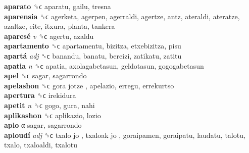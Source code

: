 \textbf{aparato} ␝ϲ  aparatu, gailu, tresna  \\
\textbf{aparensia} ␝ϲ  agerketa, agerpen, agerraldi, agertze, antz, ateraldi, ateratze, azaltze, eite, itxura, planta, tankera  \\
\textbf{aparesé} \emph{v}  ␝ϲ  agertu, azaldu  \\
\textbf{apartamento} ␝ϲ  apartamentu, bizitza, etxebizitza, pisu  \\
\textbf{apartá} \emph{adj}  ␝ϲ  banandu, banatu, bereizi, zatikatu, zatitu  \\
\textbf{apatia} \emph{n}  ␝ϲ  apatia, axolagabetasun, geldotasun, gogogabetasun  \\
\textbf{apel} ␝ϲ  sagar, sagarrondo  \\
\textbf{apelashon} ␝ϲ   gora jotze , apelazio, erregu, errekurtso  \\
\textbf{apertura} ␝ϲ  irekidura  \\
\textbf{apetit} \emph{n}  ␝ϲ  gogo, gura, nahi  \\
\textbf{aplikashon} ␝ϲ  aplikazio, lozio  \\
\textbf{aplo} α  sagar, sagarrondo  \\
\textbf{aploudí} \emph{adj}  ␝ϲ   txalo jo ,  txaloak jo , goraipamen, goraipatu, laudatu, talotu, txalo, txaloaldi, txalotu  \\
